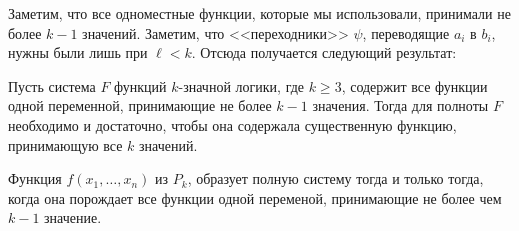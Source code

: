 Заметим, что все одноместные функции, которые мы использовали, принимали не более $k - 1$ значений. Заметим, что <<переходники>> $\psi$, переводящие $a_i$ в $b_i$, нужны были лишь при $\ell < k$. Отсюда получается следующий результат:

\begin{theorem}[Яблонский]
    Пусть система $F$ функций $k$-значной логики, где $k \geqslant 3$, содержит все функции одной переменной, принимающие не более $k - 1$ значения. Тогда для полноты $F$ необходимо и достаточно, чтобы она содержала существенную функцию, принимающую все $k$ значений.
\end{theorem}

\begin{theorem}[Мартин]
    Функция $f(x_1, \ldots, x_n)$ из $P_k$, образует полную систему тогда и только тогда, когда она порождает все функции одной переменой, принимающие не более чем $k - 1$ значение.
\end{theorem}

